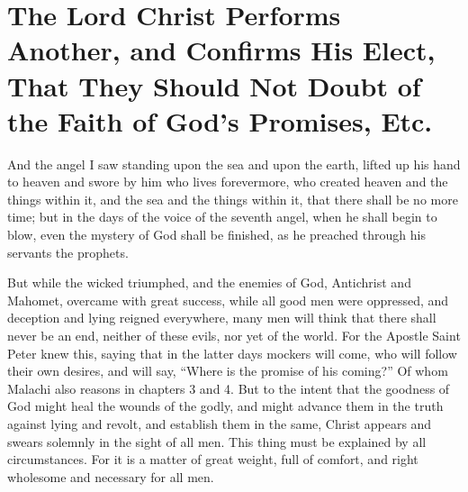 \chapter[Sermon 44. The Lord Christ Performs Another, and Confirms His Elect, That They Should Not Doubt of the Faith of God's Promises, Etc.]{The Lord Christ Performs Another, and Confirms His Elect, That They Should Not Doubt of the Faith of God's Promises, Etc.}
\label{sermon:044}

And the angel I saw standing upon the sea and upon the earth, lifted up his hand to heaven and swore by him who lives forevermore, who created heaven and the things within it, and the sea and the things within it, that there shall be no more time; but in the days of the voice of the seventh angel, when he shall begin to blow, even the mystery of God shall be finished, as he preached through his servants the prophets.

But while the wicked triumphed, and the enemies of God, Antichrist and Mahomet, overcame with great success, while all good men were oppressed, and deception and lying reigned everywhere, many men will think that there shall never be an end, neither of these evils, nor yet of the world. For the Apostle Saint Peter knew this, saying that in the latter days mockers will come, who will follow their own desires, and will say, “Where is the promise of his coming?” Of whom Malachi also reasons in chapters 3 and 4. But to the intent that the goodness of God might heal the wounds of the godly, and might advance them in the truth against lying and revolt, and establish them in the same, Christ appears and swears solemnly in the sight of all men. This thing must be explained by all circumstances. For it is a matter of great weight, full of comfort, and right wholesome and necessary for all men.

